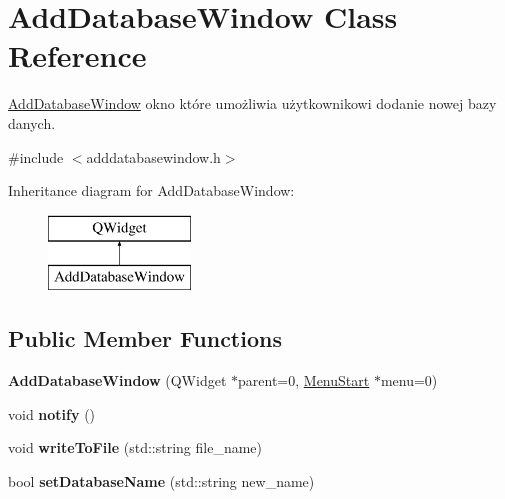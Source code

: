 \hypertarget{class_add_database_window}{}\section{Add\+Database\+Window Class Reference}
\label{class_add_database_window}


\mbox{\hyperlink{class_add_database_window}{Add\+Database\+Window}} okno które umożliwia użytkownikowi dodanie nowej bazy danych.  




{\ttfamily \#include $<$adddatabasewindow.\+h$>$}

Inheritance diagram for Add\+Database\+Window\+:\begin{figure}[H]
\begin{center}
\leavevmode
\includegraphics[height=2.000000cm]{class_add_database_window}
\end{center}
\end{figure}
\subsection*{Public Member Functions}
\begin{DoxyCompactItemize}
\item 
\mbox{\label{class_add_database_window_aaab147e23b2461e5282bbc6dac3594a5}} 
{\bfseries Add\+Database\+Window} (Q\+Widget $\ast$parent=0, \mbox{\hyperlink{class_menu_start}{Menu\+Start}} $\ast$menu=0)
\item 
\mbox{\label{class_add_database_window_a894d5c23c4772452781872f9393dc2b4}} 
void {\bfseries notify} ()
\item 
\mbox{\label{class_add_database_window_a95c48c7ed785580c33f707f75ee132ad}} 
void {\bfseries write\+To\+File} (std\+::string file\+\_\+name)
\item 
\mbox{\label{class_add_database_window_aba798c1e673e4194434ceffa62cda4fa}} 
bool {\bfseries set\+Database\+Name} (std\+::string new\+\_\+name)
\end{DoxyCompactItemize}


